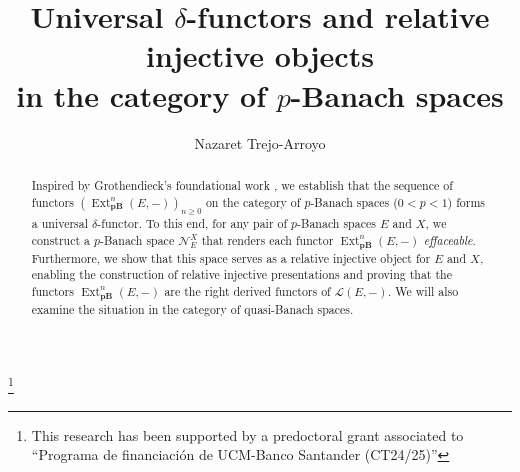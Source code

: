 \documentclass[12pt,a4paper]{amsproc}
\theoremstyle{remark}
\theoremstyle{definition}
\newcommand{\Ext}{\operatorname{Ext}}
\newcommand{\pBan}{\operatorname{\textbf{pB}}}
\numberwithin{equation}{section}
\begin{document}
	\title[Universal $\delta$-functors and relative derivation in $\pBan$]{Universal $\delta$-functors and relative injective objects \\ in the category of $p$-Banach spaces}
	
	\author[N. Trejo-Arroyo]{Nazaret Trejo-Arroyo}
	\address{Universidad Complutense de Madrid\\ Plaza de las Ciencias, s/n \\ 28040-Madrid\\ Spain} 

    \thanks{This research has been supported by a predoctoral grant associated to ``Programa de financiación de UCM-Banco Santander (CT24/25)''}
	\maketitle
\begin{abstract}
Inspired by Grothendieck's foundational work \cite{tohoku}, we establish that the sequence of functors $(\Ext^n_{\pBan}(E,-))_{n \ge 0}$ on the category of $p$-Banach spaces ($0 < p < 1$) forms a universal $\delta$-functor. To this end, for any pair of $p$-Banach spaces $E$ and $X$, we construct a  $p$-Banach space $\mathcal N_E^X$ that renders each functor $\Ext^n_{\pBan}(E,-)$ \emph{effaceable}. Furthermore, we show that this space serves as a relative injective object for $E$ and $X$, enabling the construction of relative injective presentations and proving that the functors $\Ext^n_{\pBan}(E,-)$ are the right derived functors of $\mathcal{L}(E,-)$. We will also examine the situation in the category of quasi-Banach spaces.
\end{abstract}  
\end{document}
